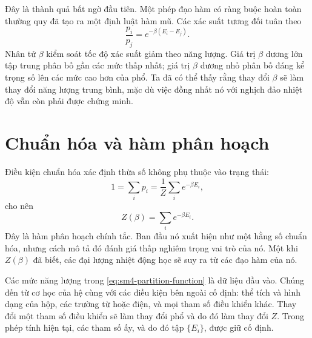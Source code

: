 Đây là thành quả bất ngờ đầu tiên. Một phép đạo hàm có ràng buộc hoàn toàn thường quy đã tạo ra một định luật hàm mũ. Các xác suất tương đối tuân theo
\begin{equation}
 \frac{p_i}{p_j}=e^{-\beta(E_i-E_j)}.
 \label{eq:sm4-relative-weight}
\end{equation}
Nhân tử \(\beta\) kiểm soát tốc độ xác suất giảm theo năng lượng. Giá trị \(\beta\) dương lớn tập trung phân bố gần các mức thấp nhất; giá trị \(\beta\) dương nhỏ phân bố đáng kể trọng số lên các mức cao hơn của phổ. Ta đã có thể thấy rằng thay đổi \(\beta\) sẽ làm thay đổi năng lượng trung bình, mặc dù việc đồng nhất nó với nghịch đảo nhiệt độ vẫn còn phải được chứng minh.

\section{Chuẩn hóa và hàm phân hoạch}

Điều kiện chuẩn hóa xác định thừa số không phụ thuộc vào trạng thái:
\begin{equation}
 1=\sum_i p_i
 =\frac{1}{Z}\sum_i e^{-\beta E_i},
\end{equation}
cho nên
\begin{equation}
 Z(\beta)=\sum_i e^{-\beta E_i}.
 \label{eq:sm4-partition-function}
\end{equation}
Đây là hàm phân hoạch chính tắc. Ban đầu nó xuất hiện như một hằng số chuẩn hóa, nhưng cách mô tả đó đánh giá thấp nghiêm trọng vai trò của nó. Một khi \(Z(\beta)\) đã biết, các đại lượng nhiệt động học sẽ suy ra từ các đạo hàm của nó.

Các mức năng lượng trong \eqref{eq:sm4-partition-function} là dữ liệu đầu vào. Chúng
đến từ cơ học của hệ cùng với các điều kiện bên ngoài cố định: thể tích và hình dạng của hộp, các trường từ hoặc điện, và mọi tham số điều khiển khác. Thay đổi một tham số điều khiển sẽ làm thay đổi phổ và do đó làm thay đổi \(Z\). Trong phép tính hiện tại, các tham số ấy, và do đó tập \(\{E_i\}\), được giữ cố định.

\begin{classroomqa}
\end{classroomqa}

